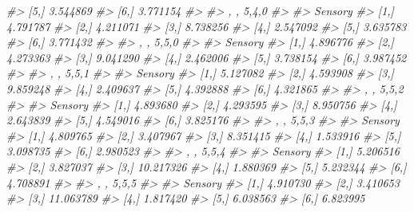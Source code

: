 \documentclass[
]{article}
\newenvironment{Shaded}{\begin{snugshade}}{\end{snugshade}}
\newcommand{\CommentTok}[1]{\textcolor[rgb]{0.56,0.35,0.01}{\textit{#1}}}
\begin{document}
\begin{Shaded}
\begin{Highlighting}[]
\CommentTok{\#\textgreater{} [5,] 3.544869}
\CommentTok{\#\textgreater{} [6,] 3.771154}
\CommentTok{\#\textgreater{} }
\CommentTok{\#\textgreater{} , , 5,4,0}
\CommentTok{\#\textgreater{} }
\CommentTok{\#\textgreater{}       Sensory}
\CommentTok{\#\textgreater{} [1,] 4.791787}
\CommentTok{\#\textgreater{} [2,] 4.211071}
\CommentTok{\#\textgreater{} [3,] 8.738256}
\CommentTok{\#\textgreater{} [4,] 2.547092}
\CommentTok{\#\textgreater{} [5,] 3.635783}
\CommentTok{\#\textgreater{} [6,] 3.771432}
\CommentTok{\#\textgreater{} }
\CommentTok{\#\textgreater{} , , 5,5,0}
\CommentTok{\#\textgreater{} }
\CommentTok{\#\textgreater{}       Sensory}
\CommentTok{\#\textgreater{} [1,] 4.896776}
\CommentTok{\#\textgreater{} [2,] 4.273363}
\CommentTok{\#\textgreater{} [3,] 9.041290}
\CommentTok{\#\textgreater{} [4,] 2.462006}
\CommentTok{\#\textgreater{} [5,] 3.738154}
\CommentTok{\#\textgreater{} [6,] 3.987452}
\CommentTok{\#\textgreater{} }
\CommentTok{\#\textgreater{} , , 5,5,1}
\CommentTok{\#\textgreater{} }
\CommentTok{\#\textgreater{}       Sensory}
\CommentTok{\#\textgreater{} [1,] 5.127082}
\CommentTok{\#\textgreater{} [2,] 4.593908}
\CommentTok{\#\textgreater{} [3,] 9.859248}
\CommentTok{\#\textgreater{} [4,] 2.409637}
\CommentTok{\#\textgreater{} [5,] 4.392888}
\CommentTok{\#\textgreater{} [6,] 4.321865}
\CommentTok{\#\textgreater{} }
\CommentTok{\#\textgreater{} , , 5,5,2}
\CommentTok{\#\textgreater{} }
\CommentTok{\#\textgreater{}       Sensory}
\CommentTok{\#\textgreater{} [1,] 4.893680}
\CommentTok{\#\textgreater{} [2,] 4.293595}
\CommentTok{\#\textgreater{} [3,] 8.950756}
\CommentTok{\#\textgreater{} [4,] 2.643839}
\CommentTok{\#\textgreater{} [5,] 4.549016}
\CommentTok{\#\textgreater{} [6,] 3.825176}
\CommentTok{\#\textgreater{} }
\CommentTok{\#\textgreater{} , , 5,5,3}
\CommentTok{\#\textgreater{} }
\CommentTok{\#\textgreater{}       Sensory}
\CommentTok{\#\textgreater{} [1,] 4.809765}
\CommentTok{\#\textgreater{} [2,] 3.407967}
\CommentTok{\#\textgreater{} [3,] 8.351415}
\CommentTok{\#\textgreater{} [4,] 1.533916}
\CommentTok{\#\textgreater{} [5,] 3.098735}
\CommentTok{\#\textgreater{} [6,] 2.980523}
\CommentTok{\#\textgreater{} }
\CommentTok{\#\textgreater{} , , 5,5,4}
\CommentTok{\#\textgreater{} }
\CommentTok{\#\textgreater{}        Sensory}
\CommentTok{\#\textgreater{} [1,]  5.206516}
\CommentTok{\#\textgreater{} [2,]  3.827037}
\CommentTok{\#\textgreater{} [3,] 10.217326}
\CommentTok{\#\textgreater{} [4,]  1.880369}
\CommentTok{\#\textgreater{} [5,]  5.232344}
\CommentTok{\#\textgreater{} [6,]  4.708891}
\CommentTok{\#\textgreater{} }
\CommentTok{\#\textgreater{} , , 5,5,5}
\CommentTok{\#\textgreater{} }
\CommentTok{\#\textgreater{}        Sensory}
\CommentTok{\#\textgreater{} [1,]  4.910730}
\CommentTok{\#\textgreater{} [2,]  3.410653}
\CommentTok{\#\textgreater{} [3,] 11.063789}
\CommentTok{\#\textgreater{} [4,]  1.817420}
\CommentTok{\#\textgreater{} [5,]  6.038563}
\CommentTok{\#\textgreater{} [6,]  6.823995}
\end{Highlighting}
\end{Shaded}
\end{document}
